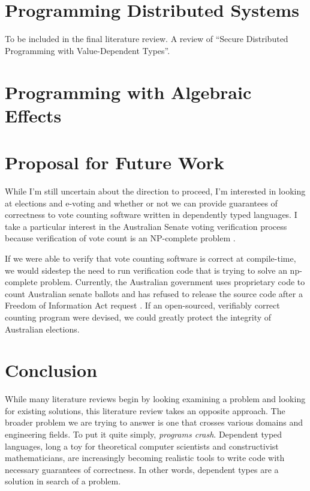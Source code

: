\section{Programming Distributed Systems}

To be included in the final literature review. A review of ``Secure Distributed
Programming with Value-Dependent Types''. \cite{fstar_distributed_programming}

\section{Programming with Algebraic Effects}



\section{Proposal for Future Work}

While I'm still uncertain about the direction to proceed, I'm interested in
looking at elections and e-voting and whether or not we can provide guarantees
of correctness to vote counting software written in dependently typed languages.
I take a particular interest in the Australian Senate voting verification
process because verification of vote count is an NP-complete problem
\cite{aus_senate}. 

If we were able to verify that vote counting software is correct at
compile-time, we would sidestep the need to run verification code that is trying
to solve an np-complete problem. Currently, the Australian government uses
proprietary code to count Australian senate ballots and has refused to release
the source code after a Freedom of Information Act request
\cite{aus_senate_news}. If an open-sourced, verifiably correct counting
program were devised, we could greatly protect the integrity of Australian
elections. 

\section{Conclusion}
While many literature reviews begin by looking examining a problem and looking
for existing solutions, this literature review takes an opposite approach. The
broader problem we are trying to answer is one that crosses various domains and
engineering fields. To put it quite simply, \textit{programs crash}. Dependent
typed languages, long a toy for theoretical computer scientists and
constructivist mathematicians, are increasingly becoming realistic tools to
write code with necessary guarantees of correctness. In other words, dependent
types are a solution in search of a problem. 

